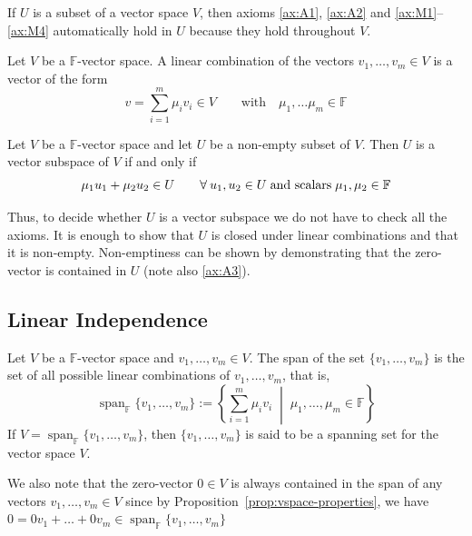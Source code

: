 		\noindent If $U$ is a subset of a vector space $V$, then axioms \ref{ax:A1}, \ref{ax:A2} and \ref{ax:M1}–\ref{ax:M4} automatically hold in $U$ because they hold throughout $V$.
		
		\begin{definition}
			Let $V$ be a $\mathbb{F}$-vector space. A linear combination of the vectors $v_1, \dots, v_m \in V$ is a vector of the form 
			\[
				v = \sum_{i=1}^{m} \mu_i v_i \in V \qquad \text{with} \quad \mu_1, \dots \mu_m \in \mathbb{F}
			\]
		\end{definition}
		
		\begin{proposition}
			Let $V$ be a $\mathbb{F}$-vector space and let $U$ be a non-empty subset of $V$. Then $U$ is a vector subspace of $V$ if and only if 
			\[
				\mu_1 u_1 + \mu_2 u_2 \in U \qquad \forall \: u_1, u_2 \in U \; \textnormal{and scalars} \; \mu_1, \mu_2 \in \mathbb{F}
			\]
		\end{proposition}
		
		\noindent Thus, to decide whether $U$ is a vector subspace we do not have to check all the axioms. It is enough to show that $U$ is closed under linear combinations and that it is non-empty. \newline
		\indent Non-emptiness can be shown by demonstrating that the zero-vector is contained in $U$ (note also \ref{ax:A3}).
		
	\subsection{Linear Independence}
		
		\begin{definition}[Span]
			\label{def:span}
			Let $V$ be a $\mathbb{F}$-vector space and $v_1, \dots, v_m \in V$. The span of the set $\{v_1, \dots, v_m\}$ is the set of all possible linear combinations of $v_1, \dots, v_m$, that is,
			\[
				\operatorname{span}_{\mathbb{F}} \{ v_1, \dots, v_m \} := \left\{ \sum_{i=1}^{m} \mu_i v_i \; \middle| \; \mu_1, \dots, \mu_m \in \mathbb{F} \right\}
			\]
			If $V = \operatorname{span}_{\mathbb{F}}\{v_1, \dots, v_m\}$, then $\{v_1, \dots, v_m\}$ is said to be a spanning set for the vector space $V$.
		\end{definition}
		
		\noindent We also note that the zero-vector $0 \in V$ is always contained in the span of any vectors $v_1, \dots, v_m \in V$ since by Proposition~\ref{prop:vspace-properties}, we have $0 = 0v_1 + \dots + 0v_m \in \operatorname{span}_{\mathbb{F}} \{ v_1, \dots, v_m \}$
		
